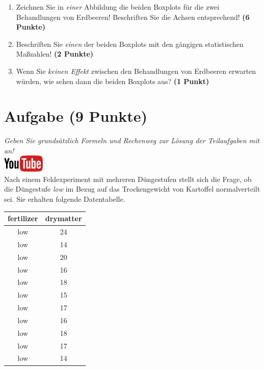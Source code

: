 \documentclass[a4paper, 10pt]{scrartcl}\usepackage[]{graphicx}\usepackage[]{xcolor}
\begin{document}
\begin{enumerate}
\item Zeichnen Sie in \textit{einer} Abbildung die beiden Boxplots f{\"u}r die
  zwei Behandlungen von Erdbeeren! Beschriften Sie die Achsen entsprechend!
  \textbf{(6 Punkte)}
\item Beschriften Sie \textit{einen} der beiden Boxplots mit den g{\"a}ngigen
  statistischen Ma{\ss}zahlen! \textbf{(2 Punkte)}
\item Wenn Sie \textit{keinen Effekt} zwischen den Behandlungen von
  Erdbeeren erwarten w{\"u}rden, wie sehen dann die beiden Boxplots aus?
  \textbf{(1 Punkt)}
\end{enumerate} 
\clearpage

\section{Aufgabe \hfill (9 Punkte)}

\textit{Geben Sie grunds{\"a}tzlich Formeln und Rechenweg zur L{\"o}sung der
  Teilaufgaben mit an!} \\[1Ex]

\hfill\href{https://youtu.be/VX4Hs81h8_A}{\includegraphics[width =
  2cm]{img/youtube}}\\[1Ex]



Nach einem Feldexperiment mit mehreren D{\"u}ngestufen stellt sich die Frage,
ob die D{\"u}ngestufe \textit{low} im Bezug auf das Trockengewicht von Kartoffel
normalverteilt sei. Sie erhalten folgende Datentabelle.

\begin{table}[!h]
\centering
\begin{tabular}{cc}
\toprule
fertilizer & drymatter\\
\midrule
low & 24\\
low & 14\\
low & 20\\
low & 16\\
low & 18\\
\addlinespace
low & 15\\
low & 17\\
low & 16\\
low & 18\\
low & 17\\
\addlinespace
low & 14\\
\bottomrule
\end{tabular}
\end{table}
\end{document}
